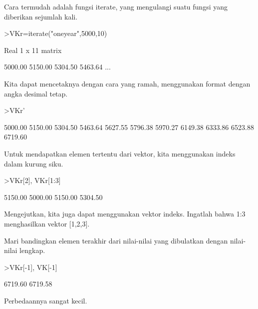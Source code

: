 \documentclass[12pt,arial,letterpaper]{book}
\begin{document}
\begin{eulercomment}
\begin{eulercomment}
\begin{eulercomment}
\begin{eulercomment}
\begin{eulercomment}
\begin{eulercomment}
\begin{eulercomment}
\begin{eulercomment}
\begin{eulercomment}
\begin{eulercomment}
\begin{eulercomment}
Cara termudah adalah fungsi iterate, yang mengulangi suatu fungsi yang
diberikan sejumlah kali.
\end{eulercomment}
\begin{eulerprompt}
>VKr=iterate("oneyear",5000,10)
\end{eulerprompt}
\begin{euleroutput}
  Real 1 x 11 matrix
  
      5000.00     5150.00     5304.50     5463.64     ...
\end{euleroutput}
\begin{eulercomment}
Kita dapat mencetaknya dengan cara yang ramah, menggunakan format
dengan angka desimal tetap.
\end{eulercomment}
\begin{eulerprompt}
>VKr'
\end{eulerprompt}
\begin{euleroutput}
      5000.00 
      5150.00 
      5304.50 
      5463.64 
      5627.55 
      5796.38 
      5970.27 
      6149.38 
      6333.86 
      6523.88 
      6719.60 
\end{euleroutput}
\begin{eulercomment}
Untuk mendapatkan elemen tertentu dari vektor, kita menggunakan indeks
dalam kurung siku.
\end{eulercomment}
\begin{eulerprompt}
>VKr[2], VKr[1:3]
\end{eulerprompt}
\begin{euleroutput}
      5150.00 
      5000.00     5150.00     5304.50 
\end{euleroutput}
\begin{eulercomment}
Mengejutkan, kita juga dapat menggunakan vektor indeks. Ingatlah bahwa
1:3 menghasilkan vektor [1,2,3].

Mari bandingkan elemen terakhir dari nilai-nilai yang dibulatkan
dengan nilai-nilai lengkap.
\end{eulercomment}
\begin{eulerprompt}
>VKr[-1], VK[-1]
\end{eulerprompt}
\begin{euleroutput}
      6719.60 
      6719.58 
\end{euleroutput}
\begin{eulercomment}
Perbedaannya sangat kecil.


\end{eulercomment}
\end{eulercomment}
\end{eulercomment}
\end{eulercomment}
\end{eulercomment}
\end{eulercomment}
\end{eulercomment}
\end{eulercomment}
\end{eulercomment}
\end{eulercomment}
\end{eulercomment}
\end{document}
